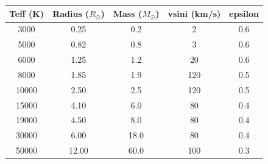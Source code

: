 \begin{table}[ht]
\centering
\begin{tabular}{ccccc}
\toprule
Teff (K) & Radius ($R_\odot$) & Mass ($M_\odot$) & vsini (km/s) & epsilon \\
\midrule
3000 & 0.25 & 0.2 & 2 & 0.6 \\
5000 & 0.82 & 0.8 & 3 & 0.6 \\
6000 & 1.25 & 1.2 & 20 & 0.6 \\
8000 & 1.85 & 1.9 & 120 & 0.5 \\
10000 & 2.50 & 2.5 & 120 & 0.5 \\
15000 & 4.10 & 6.0 & 80 & 0.4 \\
19000 & 4.50 & 8.0 & 80 & 0.4 \\
30000 & 6.00 & 18.0 & 80 & 0.4 \\
50000 & 12.00 & 60.0 & 100 & 0.3 \\
\bottomrule
\end{tabular}
\end{table}